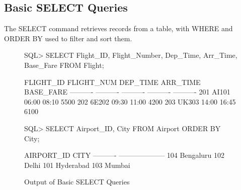 \documentclass[12pt,a4paper]{article}
\begin{document}
\subsection{Basic SELECT Queries}
The SELECT command retrieves records from a table, with WHERE and ORDER BY used to filter and sort them.
\begin{figure}[H]
\begin{terminal}
SQL> SELECT Flight_ID, Flight_Number, Dep_Time, Arr_Time, Base_Fare FROM Flight;

 FLIGHT_ID FLIGHT_NUM DEP_TIME   ARR_TIME    BASE_FARE
---------- ---------- ---------- ---------- ----------
       201 AI101      06:00      08:10            5500
       202 6E202      09:30      11:00            4200
       203 UK303      14:00      16:45            6100

SQL> SELECT Airport_ID, City FROM Airport ORDER BY City;

AIRPORT_ID CITY
---------- --------------------
       104 Bengaluru
       102 Delhi
       101 Hyderabad
       103 Mumbai
\end{terminal}
\caption{Output of Basic SELECT Queries}
\end{figure}
\end{document}
